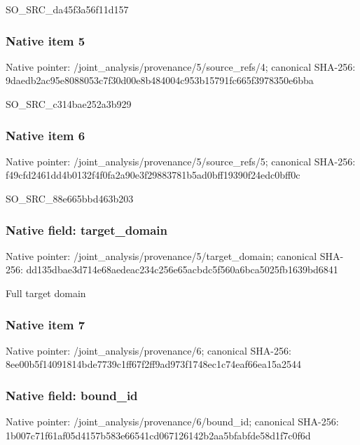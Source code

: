 \documentclass[10pt,a4paper]{article}
\begin{document}
\begingroup\raggedright\sloppy SO\_\allowbreak{}SRC\_\allowbreak{}da45f3a56f11d157\par\endgroup

\subsubsection{Native item 5}
Native pointer: /joint\_\allowbreak{}analysis/provenance/5/source\_\allowbreak{}refs/4; canonical SHA-256: 9daedb2ac95e8088053c7f30d00e8b484004c953b15791fc665f3978350e6bba

\begingroup\raggedright\sloppy SO\_\allowbreak{}SRC\_\allowbreak{}c314bae252a3b929\par\endgroup

\subsubsection{Native item 6}
Native pointer: /joint\_\allowbreak{}analysis/provenance/5/source\_\allowbreak{}refs/5; canonical SHA-256: f49cfd2461dd4b0132f4f0fa2a90e3f29883781b5ad0bff19390f24edc0bff0c

\begingroup\raggedright\sloppy SO\_\allowbreak{}SRC\_\allowbreak{}88e665bbd463b203\par\endgroup

\subsubsection{Native field: target\_\allowbreak{}domain}
Native pointer: /joint\_\allowbreak{}analysis/provenance/5/target\_\allowbreak{}domain; canonical SHA-256: dd135dbae3d714e68aedeac234c256e65acbdc5f560a6bca5025fb1639bd6841

\begingroup\raggedright\sloppy Full target domain\par\endgroup

\subsubsection{Native item 7}
Native pointer: /joint\_\allowbreak{}analysis/provenance/6; canonical SHA-256: 8ee00b5f14091814bde7739c1ff67f2ff9ad973f1748ec1c74eaf66ea15a2544

\subsubsection{Native field: bound\_\allowbreak{}id}
Native pointer: /joint\_\allowbreak{}analysis/provenance/6/bound\_\allowbreak{}id; canonical SHA-256: 1b007c71f61af05d4157b583e66541cd067126142b2aa5bfabfde58d1f7c0f6d
\end{document}
